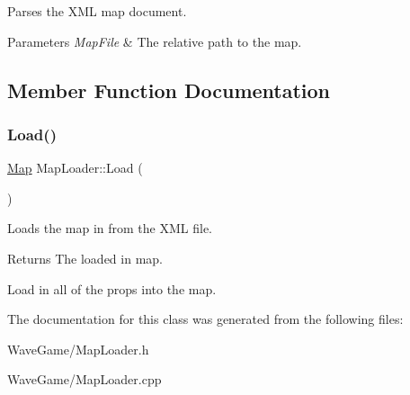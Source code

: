 Parses the X\+ML map document. 


\begin{DoxyParams}{Parameters}
{\em Map\+File} & The relative path to the map.\\
\hline
\end{DoxyParams}


\subsection{Member Function Documentation}
\mbox{\label{class_map_loader_a9091d4af0b00a48ae7d9e8e1e46cd0fd}} 
\subsubsection{\texorpdfstring{Load()}{Load()}}
{\footnotesize\ttfamily \hyperlink{class_map}{Map} Map\+Loader\+::\+Load (\begin{DoxyParamCaption}{ }\end{DoxyParamCaption})}



Loads the map in from the X\+ML file. 

\begin{DoxyReturn}{Returns}
The loaded in map.
\end{DoxyReturn}
Load in all of the props into the map. 

The documentation for this class was generated from the following files\+:\begin{DoxyCompactItemize}
\item 
Wave\+Game/Map\+Loader.\+h\item 
Wave\+Game/Map\+Loader.\+cpp\end{DoxyCompactItemize}
